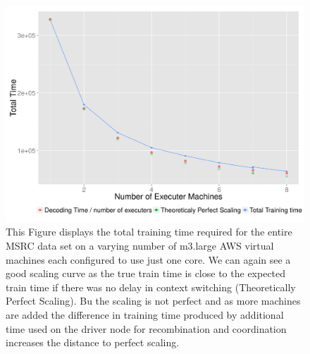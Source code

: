 \begin{figure}
  \centering
  \includegraphics[width=1.0\textwidth]{images/scalabilityDistributed_msrc.png}
  \caption{ This Figure displays the total training time required for the entire MSRC data set on a varying number of m3.large AWS virtual machines each configured to use just one core. We can again see a good scaling curve as the true train time is close to the expected train time if there was no delay in context switching (Theoretically Perfect Scaling). Bu the scaling is not perfect and as more machines are added the difference in training time produced by additional time used on the driver node for recombination and coordination increases the distance to perfect scaling. } 
  \label{fig:scaleDistrmsrc1}
 
\end{figure}

